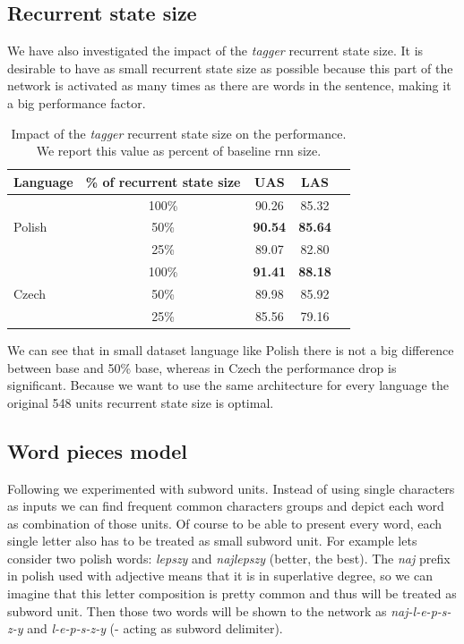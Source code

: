 \subsection{Recurrent state size}
We have also investigated the impact of the \emph{tagger} recurrent state size.
It is desirable to have as small recurrent state size as possible because this
part of the network is activated as many times as there are words in the sentence,
making it a big performance factor.

\begin{table}[!htbp]
    \centering
    \begin{tabular}{l c c c c}
        Language & \% of recurrent state size & UAS & LAS \\ \hline
        \multirow{3}{*}{Polish}& 100\% & 90.26 & 85.32 \\
        & 50\% & \textbf{90.54} & \textbf{85.64} \\
        & 25\% & 89.07 & 82.80 \\ \hline
        \multirow{3}{*}{Czech}& 100\% & \textbf{91.41} & \textbf{88.18}\\
        & 50\% & 89.98 & 85.92\\
        & 25\% & 85.56 & 79.16\\ \hline%
    \end{tabular}
    \label{tab:birnn_single_size}
    \caption{Impact of the \emph{tagger} recurrent state size on the performance.
    We report this value as percent of baseline rnn size.}
\end{table}

We can see that in small dataset language like Polish there is not a big difference
between base and 50\% base, whereas in Czech the performance drop is significant.
Because we want to use the same architecture for every language the original 548
units recurrent state size is optimal.

\subsection{Word pieces model}
Following \cite{sennrich_subword_2015} we experimented with subword units.
Instead of using single characters as inputs we can find frequent common characters groups and
depict each word as combination of those units. Of course to be able to
present every word, each single letter also has to be treated as small subword unit. 
For example lets consider two polish words: \emph{lepszy} and \emph{najlepszy} (better, the best).
The \emph{naj} prefix in polish used with adjective means that it is in superlative degree,
so we can imagine that this letter composition is pretty common and thus will be
treated as subword unit. Then those two words will be shown to the network as
\emph{naj-l-e-p-s-z-y} and \emph{l-e-p-s-z-y} (- acting as subword delimiter).

